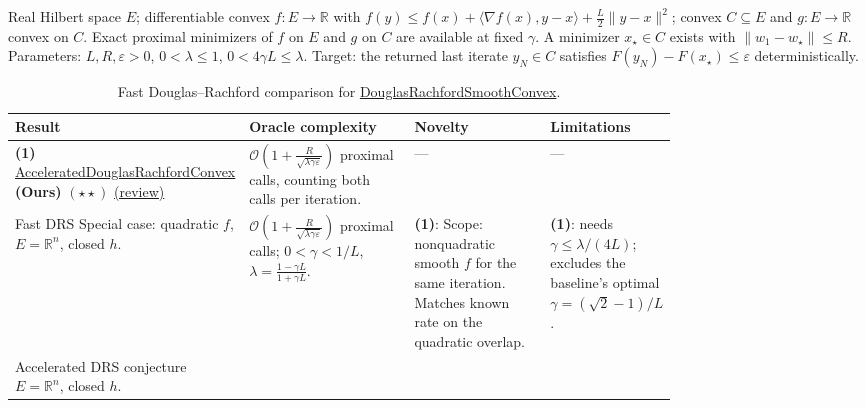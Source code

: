 \begin{table}[tp]
\centering
\caption{Fast Douglas--Rachford comparison for \href{https://github.com/k3nfalt/longtails/blob/main/LongTails/Setups/DouglasRachfordSmoothConvex.lean}{Douglas\allowbreak{}Rachford\allowbreak{}Smooth\allowbreak{}Convex}.}\label{tab:DouglasRachfordSmoothConvex}
\parbox{\linewidth}{\footnotesize Real Hilbert space $E$; differentiable convex $f:E\to\mathbb{R}$ with $f(y)\le f(x)+\langle\nabla f(x),y-x\rangle+\frac L2\|y-x\|^2$; convex $C\subseteq E$ and $g:E\to\mathbb{R}$ convex on $C$. Exact proximal minimizers of $f$ on $E$ and $g$ on $C$ are available at fixed $\gamma$. A minimizer $x_\star\in C$ exists with $\|w_1-w_\star\|\le R$. Parameters: $L,R,\varepsilon>0$, $0<\lambda\le1$, $0<4\gamma L\le\lambda$. Target: the returned last iterate $y_N\in C$ satisfies $F(y_N)-F(x_\star)\le\varepsilon$ deterministically.}\par\smallskip
\begin{threeparttable}
\footnotesize
\setlength{\tabcolsep}{4pt}\renewcommand{\arraystretch}{1.25}
\begin{tabularx}{\linewidth}{@{}>{\raggedright\arraybackslash}p{0.20\linewidth}>{\raggedright\arraybackslash}p{0.32\linewidth}>{\raggedright\arraybackslash}p{0.25\linewidth}>{\raggedright\arraybackslash}X@{}}
\toprule
\textbf{Result} & \textbf{Oracle complexity} & \textbf{Novelty} & \textbf{Limitations} \\
\midrule
\textbf{(1)} \href{https://github.com/k3nfalt/longtails/blob/main/LongTails/Theorems/AcceleratedDouglasRachfordConvex.lean}{Accelerated\allowbreak{}Douglas\allowbreak{}Rachford\allowbreak{}Convex} \textbf{(Ours)} $(\star\star)$ \href{https://github.com/k3nfalt/longtails/blob/main/scripts/reviews/AcceleratedDouglasRachfordConvex.md}{(review)}
& $\mathcal{O}\!\left(1+\frac{R}{\sqrt{\lambda\gamma\varepsilon}}\right)$ proximal calls, counting both calls per iteration.
& ---
& --- \\
\midrule[1.2pt]
Fast DRS \citep[Thm.~5]{drPSB2014v2}\newline Special case: quadratic $f$, $E=\mathbb{R}^n$, closed $h$.
& $\mathcal{O}\!\left(1+\frac{R}{\sqrt{\lambda\gamma\varepsilon}}\right)$ proximal calls; $0<\gamma<1/L$, $\lambda=\frac{1-\gamma L}{1+\gamma L}$.
& \textbf{(1)}: Scope: nonquadratic smooth $f$ for the same iteration. Matches known rate on the quadratic overlap.
& \textbf{(1)}: needs $\gamma\le\lambda/(4L)$; excludes the baseline's optimal $\gamma=(\sqrt2-1)/L$. \\
\midrule
Accelerated DRS conjecture \citep[Conjecture~4]{drAZ2025v2}\newline $E=\mathbb{R}^n$, closed $h$.

\end{tabularx}
\end{threeparttable}
\end{table}
